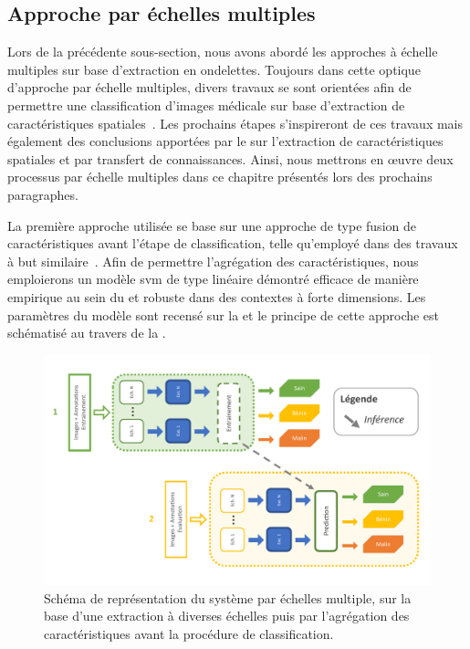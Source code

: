 \subsection{Approche par échelles multiples}
Lors de la précédente sous-section, nous avons abordé les approches à échelle multiples sur base d'extraction en ondelettes. Toujours dans cette optique d'approche par échelle multiples, divers travaux se sont orientées afin de permettre une classification d'images médicale sur base d'extraction de caractéristiques spatiales~\cite{Alsaih2016,Tzalavra2016}. Les prochains étapes s'inspireront de ces travaux mais également des conclusions apportées par le  sur l'extraction de caractéristiques spatiales et par transfert de connaissances. Ainsi, nous mettrons en œuvre deux processus par échelle multiples dans ce chapitre présentés lors des prochains paragraphes.\par

La première approche utilisée se base sur une approche de type fusion de caractéristiques avant l'étape de classification, telle qu'employé dans des travaux à but similaire~\cite{Pedersoli2011,Alsaih2016}. Afin de permettre l'agrégation des caractéristiques, nous emploierons un modèle \gls{svm} de type linéaire démontré efficace de manière empirique au sein du  et robuste dans des contextes à forte dimensions. Les paramètres du modèle sont recensé sur la  et le principe de cette approche est schématisé au travers de la .\par

\begin{figure}[H]
    \centering
    \includegraphics[width=\linewidth]{contents/chapter_5/resources/scheme_image_improvement_multiscale_features.pdf}
    \caption{Schéma de représentation du système par échelles multiple, sur la base d'une extraction à diverses échelles puis par l'agrégation des caractéristiques avant la procédure de classification.}
    \label{fig:scheme_image_improvement_multiscale_features}
\end{figure}\par

